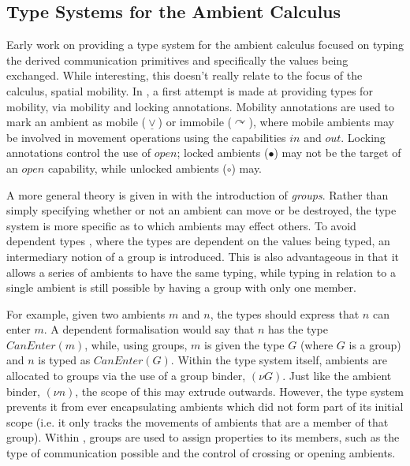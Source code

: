 
\subsection{Type Systems for the Ambient Calculus}
\label{ambienttypes}

Early work \cite{commtypesamb} on providing a type system for the
ambient calculus focused on typing the derived communication primitives
and specifically the values being exchanged.  While interesting, this
doesn't really relate to the focus of the calculus, spatial mobility.
In \cite{cardelli:typesforambients, cardelli:ambienttypes}, a first
attempt is made at providing types for mobility, via mobility and locking
annotations.  Mobility annotations are used to mark an ambient as mobile
($\underline{\vee}$) or immobile ($\curvearrowright$), where mobile
ambients may be involved in movement operations using the capabilities
$in$ and $out$.  Locking annotations control the use of $open$; locked
ambients ($\bullet$) may not be the target of an $open$ capability,
while unlocked ambients ($\circ$) may.

A more general theory is given in \cite{ambienttypes} with the
introduction of \emph{groups}.  Rather than simply specifying whether or
not an ambient can move or be destroyed, the type system is more
specific as to which ambients may effect others.  To avoid dependent
types \cite{deptypes}, where the types are dependent on the values being
typed, an intermediary notion of a group is introduced.  This is also
advantageous in that it allows a series of ambients to have the same
typing, while typing in relation to a single ambient is still possible
by having a group with only one member.

For example, given two ambients $m$ and $n$, the types should express
that $n$ can enter $m$.  A dependent formalisation would say that $n$
has the type $CanEnter(m)$, while, using groups, $m$ is given the type
$G$ (where $G$ is a group) and $n$ is typed as $CanEnter(G)$.  Within
the type system itself, ambients are allocated to groups via the use
of a group binder, $(\nu G)$.  Just like the ambient binder, $(\nu
n)$, the scope of this may extrude outwards.  However, the type system
prevents it from ever encapsulating ambients which did not form part
of its initial scope (i.e. it only tracks the movements of ambients
that are a member of that group).  Within \cite{ambienttypes}, groups
are used to assign properties to its members, such as the type of
communication possible and the control of crossing or opening
ambients.

